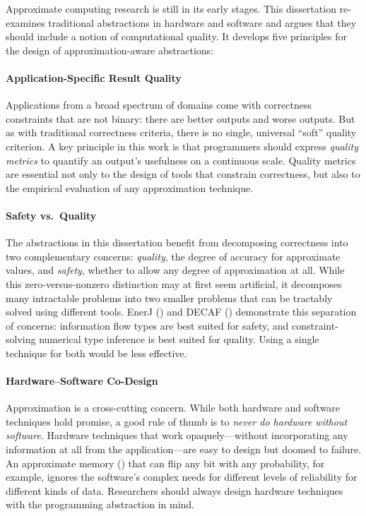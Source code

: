 Approximate computing research is still in its early stages.
This dissertation re-examines traditional abstractions in hardware and
software and argues that they should include a notion of computational
quality.
It develops five principles for the design of approximation-aware
abstractions:

\paragraph{Application-Specific Result Quality}
Applications from a broad spectrum of domains come with correctness constraints that are
not binary:
there are better outputs and worse outputs.
But as with traditional correctness criteria, there is no single, universal
``soft'' quality criterion.
A key principle in this work is that programmers should express
\emph{quality metrics} to quantify an output's usefulness on a continuous
scale.
Quality metrics are essential not only to the design of tools that constrain
correctness,
but also to the empirical evaluation of any approximation technique.

\paragraph{Safety vs.~Quality}
The abstractions in this dissertation benefit from decomposing correctness
into two complementary concerns:
\emph{quality}, the degree of accuracy for approximate values, and
\emph{safety}, whether to allow any degree of approximation at all.
While this zero-versus-nonzero distinction may at first seem artificial, it
decomposes many intractable problems into two smaller problems that can be
tractably solved using different tools.
EnerJ () and DECAF () demonstrate this separation of
concerns:
information flow types are best suited for safety,
and constraint-solving numerical type inference is best suited for quality.
Using a single technique for both would be less effective.

\paragraph{Hardware–Software Co-Design}
Approximation is a cross-cutting concern.
While both hardware and software techniques hold promise, a good rule of thumb
is to \emph{never do hardware without software}.
Hardware techniques that work opaquely---without incorporating any information
at all from the application---are easy to design but doomed to failure.
An approximate memory () that can flip any bit with any
probability, for example,
ignores the software's complex needs for different levels of reliability for
different kinds of data.
Researchers should always design hardware techniques with the programming
abstraction in mind.

